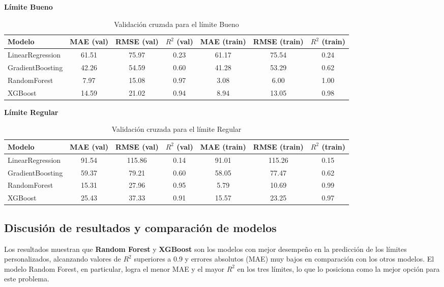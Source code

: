 \documentclass[12pt]{article}
\begin{document}
\textbf{Límite Bueno}
\begin{table}[h!]
    \centering
    \begin{tabular}{lcccccc}
        \toprule
        Modelo & MAE (val) & RMSE (val) & $R^2$ (val) & MAE (train) & RMSE (train) & $R^2$ (train) \\
        \midrule
        LinearRegression & 61.51 & 75.97 & 0.23 & 61.17 & 75.54 & 0.24 \\
        GradientBoosting & 42.26 & 54.59 & 0.60 & 41.28 & 53.29 & 0.62 \\
        RandomForest & 7.97 & 15.08 & 0.97 & 3.08 & 6.00 & 1.00 \\
        XGBoost & 14.59 & 21.02 & 0.94 & 8.94 & 13.05 & 0.98 \\
        \bottomrule
    \end{tabular}
    \caption{Validación cruzada para el límite Bueno}
\end{table}

\textbf{Límite Regular}
\begin{table}[h!]
    \centering
    \begin{tabular}{lcccccc}
        \toprule
        Modelo & MAE (val) & RMSE (val) & $R^2$ (val) & MAE (train) & RMSE (train) & $R^2$ (train) \\
        \midrule
        LinearRegression & 91.54 & 115.86 & 0.14 & 91.01 & 115.26 & 0.15 \\
        GradientBoosting & 59.37 & 79.21 & 0.60 & 58.05 & 77.47 & 0.62 \\
        RandomForest & 15.31 & 27.96 & 0.95 & 5.79 & 10.69 & 0.99 \\
        XGBoost & 25.43 & 37.33 & 0.91 & 15.57 & 23.25 & 0.97 \\
        \bottomrule
    \end{tabular}
    \caption{Validación cruzada para el límite Regular}
\end{table}

\subsection*{Discusión de resultados y comparación de modelos}
Los resultados muestran que \textbf{Random Forest} y \textbf{XGBoost} son los modelos con mejor desempeño en la predicción de los límites personalizados, alcanzando valores de $R^2$ superiores a 0.9 y errores absolutos (MAE) muy bajos en comparación con los otros modelos. El modelo Random Forest, en particular, logra el menor MAE y el mayor $R^2$ en los tres límites, lo que lo posiciona como la mejor opción para este problema.
\end{document}

